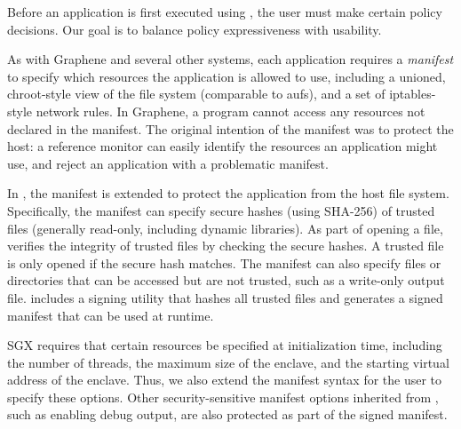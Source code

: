 Before an application is first executed using \graphenesgx{}, 
the user must make certain policy decisions.  
Our goal is to balance policy expressiveness
with usability.

As with Graphene and several other systems, each application requires a {\em manifest}
to specify which resources the application is allowed to use, including
a unioned, chroot-style view of the file system (comparable to aufs),
and a set of iptables-style network rules.
In Graphene, a program cannot access any resources not declared in the manifest.
The original intention of the manifest was to protect the host: a reference monitor 
can easily identify the resources an application might use, and reject an application
with a problematic manifest.

In \graphenesgx{}, the manifest is extended to protect the application from the host file system.
Specifically, the manifest can specify secure hashes (using SHA-256) of trusted files (generally read-only, including dynamic libraries). As part of opening a file,
\graphenesgx{} verifies the integrity of trusted files by checking the secure hashes.  A trusted file is only opened if the secure hash matches.
The manifest can also specify files or directories that can be accessed 
but are not trusted, such as a write-only output file.
\graphenesgx{} includes a signing utility that hashes all trusted files and 
generates a signed manifest that can be used at runtime.

SGX requires that certain resources be specified at initialization time, including the number of threads,
the maximum size of the enclave, and the starting virtual address of the enclave.  Thus, we also extend the manifest syntax for the 
user to specify these options.
Other security-sensitive manifest options inherited from \graphene{}, such as enabling debug output, are also protected as part of the signed manifest.




